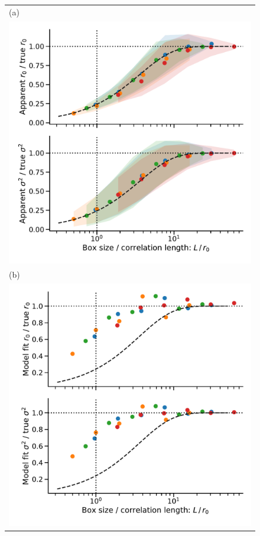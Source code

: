 \documentclass[fleqn,usenatbib, useAMS, a4paper]{mnras}
\begin{document}
\begin{figure}
  \begin{tabular}{@{} l @{}}
    (a)\\
    \includegraphics[width=0.95\linewidth]{Figures/fake-finite-box-effect}
    \\[\bigskipamount]
    (b)\\
    \includegraphics[width=0.95\linewidth]{Figures/fake-finite-box-fits}

\end{tabular}
\end{figure}
\end{document}
